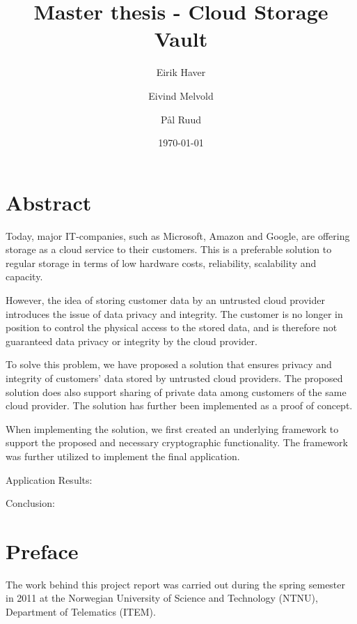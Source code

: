 \documentclass[pdftex,english,10pt,b5paper,twoside]{book}
\author{Eirik Haver \and Eivind Melvold \and Pål Ruud}
\title{Master thesis - Cloud Storage Vault}
\date{\today}
\begin{document}

\pagestyle{empty}

\chapter*{Abstract}
\pagestyle{plain}
\setcounter{page}{1}

%

Today, major IT-companies, such as Microsoft, Amazon and Google, are offering
storage as a cloud service to their customers. This is a preferable solution to
regular storage in terms of low hardware costs, reliability, scalability and capacity.

However, the idea of storing customer data by an untrusted cloud provider
introduces the issue of data privacy and integrity. The customer is no longer in
position to control the physical access to the stored data, and is therefore
not guaranteed data privacy or integrity by the cloud provider.

To solve this problem, we have proposed a solution that ensures
privacy and integrity of customers' data stored by untrusted cloud providers.
The proposed solution does also support sharing of private data among customers
of the same cloud provider. The solution has further been implemented as a proof of concept. 

When implementing the solution, we first created an underlying framework to support the
proposed and necessary cryptographic functionality. The framework was further
utilized to implement the final application.

Application Results:

Conclusion:


\chapter*{Preface}

The work behind this project report was carried out during the spring semester
in 2011 at the Norwegian University of Science and Technology (NTNU), Department
of Telematics (ITEM).
\vspace{13pt}
\end{document}
